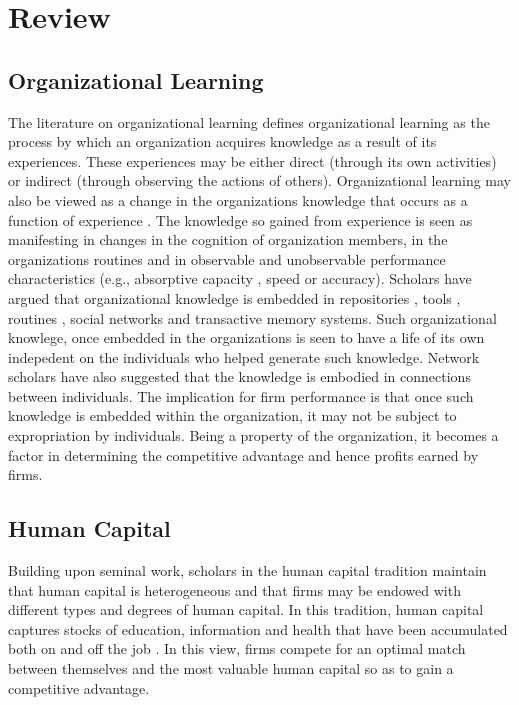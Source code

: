 \documentclass[12pt,letterpaper]{article}
\begin{document}
\section{Review}
\subsection{Organizational Learning}
The literature on organizational learning defines organizational learning as the process by which an organization acquires knowledge as a result of its experiences. These experiences may be either direct (through its own activities) or indirect (through observing the actions of others). Organizational learning may also be viewed as a change in the organization\textquotesingle s knowledge that occurs as a function of experience \citep{Levitt1988}.  The knowledge so gained from experience is seen as manifesting in changes in the cognition of organization members, in the organization\textquotesingle s routines and in observable and unobservable performance characteristics (e.g., absorptive capacity \citep{Cohen1990}, speed or accuracy). Scholars have argued that organizational knowledge is embedded in repositories \citep{Walsh1991}, tools \citep{Kogut1992}, routines \cite{Nelson1982}, social networks and transactive memory systems. Such organizational knowlege, once embedded in the organizations is seen to have a life of its own indepedent on the individuals who helped generate such knowledge. Network scholars have also suggested that the knowledge is embodied in connections between individuals. The implication for firm performance is that once such knowledge is embedded within the organization, it may not be subject to expropriation by individuals. Being a property of the organization, it becomes a factor in determining the competitive advantage and hence profits earned by firms.  

\subsection{Human Capital}
Building upon \cite{Becker1962} seminal work, scholars in the human capital tradition maintain that human capital is heterogeneous and that firms may be endowed with different types and degrees of human capital. In this tradition, human capital captures stocks of education, information and health that have been accumulated both on and off the job \citep{Becker1962}. In this view, firms compete for an optimal match between themselves and the most valuable human capital so as to gain a competitive advantage. 
\end{document}
